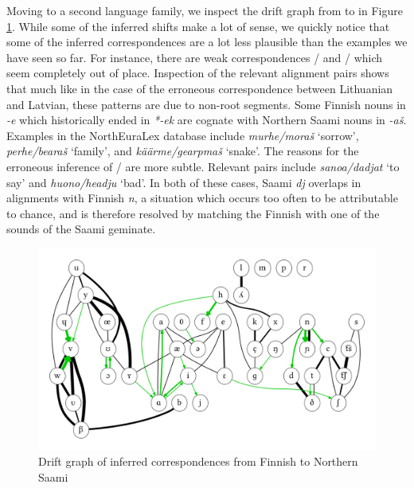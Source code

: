 Moving to a second language family, we inspect the drift graph from  to  in Figure \ref{fig:driftGraphFiSe}. While some of the inferred shifts make a lot of sense, we quickly notice that some of the inferred correspondences are a lot less plausible than the examples we have seen so far. For instance, there are weak correspondences \ipa{[E]}/\ipa{[S]} and \ipa{[n]}/\ipa{[c]} which seem completely out of place. Inspection of the relevant alignment pairs shows that much like in the case of the erroneous correspondence between Lithuanian and Latvian, these patterns are due to non-root segments. Some Finnish nouns in \textit{-e} which historically ended in \textit{*-ek} are cognate with Northern Saami nouns in \textit{-a\v{s}}. Examples in the NorthEuraLex database include \textit{murhe/mora\v{s}} `sorrow', \textit{perhe/beara\v{s}} `family', and \textit{k\"a\"arme/gearpma\v{s}} `snake'. The reasons for the erroneous inference of \ipa{[n]}/\ipa{[c]} are more subtle. Relevant pairs 
include \textit{sanoa/dadjat} `to say' and \textit{huono/headju} `bad'. In both of these cases, Saami \textit{dj} \ipa{[cc]} overlaps in alignments with Finnish \textit{n}, a situation which occurs too often to be attributable to chance, and is therefore resolved by matching the Finnish \ipa{[n]} with one of the \ipa{[c]} sounds of the Saami geminate.

\begin{figure}
    \includegraphics[width=\textwidth]{figures/drift-graph-fi-se.pdf}
    \caption{Drift graph of inferred correspondences from Finnish to Northern Saami}
    \label{fig:driftGraphFiSe}
\end{figure}

